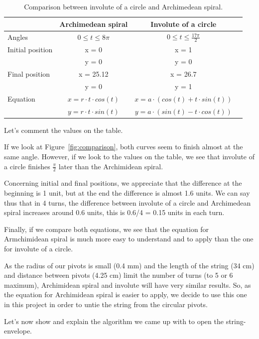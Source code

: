 \begin{table}[!ht]
\begin{center}
\begin{tabular}{l|*{2}{c}r}
	                  & Archimedean spiral & Involute of a circle \\
	\hline
	Angles            & $0 \leq t \leq 8\pi$ & $0 \leq t \leq \frac{17\pi}{2}$ \\
	\hline
	Initial position  & x = 0 & x = 1 \\
	                  & y = 0 & y = 0 \\
	\hline
	Final position    & x = 25.12 & x = 26.7 \\
	                  & y = 0     & y = 1    \\
	\hline
	Equation          & $x = r \cdot t \cdot cos(t)$ & $x = a \cdot (cos(t) + t \cdot sin(t))$ \\
	                  & $y = r \cdot t \cdot sin(t)$ & $y = a \cdot (sin(t) - t \cdot cos(t))$ \\
\end{tabular}
\end{center}
\caption{Comparison between involute of a circle and Archimedean spiral.}
\label{table:comparison}
\end{table}

Let's comment the values on the table. 

If we look at Figure~\ref{fig:comparison}, both curves seem to finish almost at the same angle. However, if we look to the values on the table, we see that involute of a circle finishes $\frac{\pi}{2}$ later than the Archimidean spiral.

Concerning initial and final positions, we appreciate that the difference at the beginning is 1 unit, but at the end the difference is almost 1.6 units. We can say thus that in 4 turns, the difference between involute of a circle and Archimedean spiral increases around 0.6 units, this is 0.6/4 = 0.15 units in each turn.

Finally, if we compare both equations, we see that the equation for Armchimidean spiral is much more easy to understand and to apply than the one for involute of a circle.

As the radius of our pivots is small (0.4 mm) and the length of the string (34 cm) and distance between pivots (4.25 cm) limit the number of turns (to 5 or 6 maximum), Archimidean spiral and involute will have very similar results. So, as the equation for Archimidean spiral is easier to apply, we decide to use this one in this project in order to untie the string from the circular pivots.

Let's now show and explain the algorithm we came up with to open the string-envelope.
